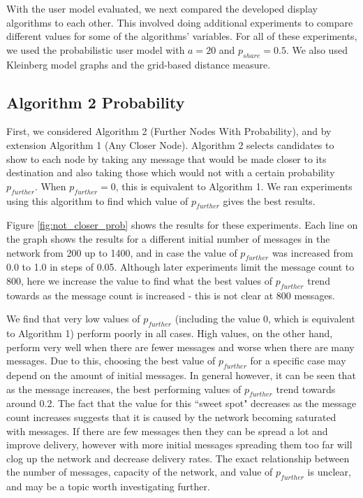 \documentclass[bsc,frontabs,twoside,singlespacing,parskip,deptreport]{infthesis}     %
\begin{document}
With the user model evaluated, we next compared the developed display algorithms to each other. This involved doing additional experiments to compare different values for some of the algorithms' variables. For all of these experiments, we used the probabilistic user model with $a = 20$ and $p_{share} = 0.5$. We also used Kleinberg model graphs and the grid-based distance measure.

\subsection{Algorithm 2 Probability} \label{subsec:algorithm_2_prob}
First, we considered Algorithm 2 (Further Nodes With Probability), and by extension Algorithm 1 (Any Closer Node). Algorithm 2 selects candidates to show to each node by taking any message that would be made closer to its destination and also taking those which would not with a certain probability $p_{further}$. When $p_{further}=0$, this is equivalent to Algorithm 1. We ran experiments using this algorithm to find which value of $p_{further}$ gives the best results.

Figure \ref{fig:not_closer_prob} shows the results for these experiments. Each line on the graph shows the results for a different initial number of messages in the network from 200 up to 1400, and in case the value of $p_{further}$ was increased from 0.0 to 1.0 in steps of 0.05. Although later experiments limit the message count to 800, here we increase the value to find what the best values of $p_{further}$ trend towards as the message count is increased - this is not clear at 800 messages.

We find that very low values of $p_{further}$ (including the value 0, which is equivalent to Algorithm 1) perform poorly in all cases. High values, on the other hand, perform very well when there are fewer messages and worse when there are many messages. Due to this, choosing the best value of $p_{further}$ for a specific case may depend on the amount of initial messages. In general however, it can be seen that as the message increases, the best performing values of $p_{further}$ trend towards around 0.2. The fact that the value for this ``sweet spot" decreases as the message count increases suggests that it is caused by the network becoming saturated with messages. If there are few messages then they can be spread a lot and improve delivery, however with more initial messages spreading them too far will clog up the network and decrease delivery rates. The exact relationship between the number of messages, capacity of the network, and value of $p_{further}$ is unclear, and may be a topic worth investigating further.
\end{document}
